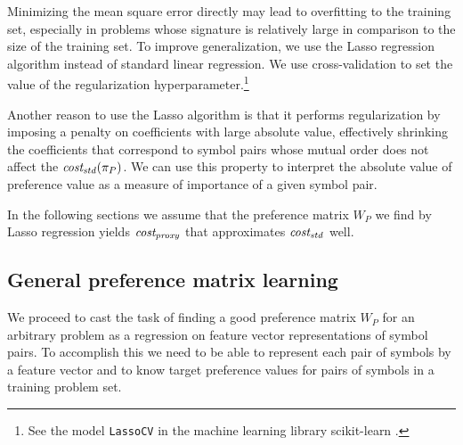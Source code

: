 \documentclass[a4paper]{easychair}
\begin{document}
Minimizing the mean square error directly may lead to overfitting to the training set,
especially in problems whose signature is relatively large in comparison to the size of the training set.
To improve generalization,
we use the Lasso regression algorithm \cite{Tibshirani1996} instead of standard linear regression.
We use cross-validation to set the value of the regularization hyperparameter.\footnote{See the model \texttt{LassoCV} in the machine learning library scikit-learn \cite{scikit-learn}.}

Another reason to use the Lasso algorithm is that it performs regularization
by imposing a penalty on coefficients with large absolute value,
effectively shrinking the coefficients that correspond to symbol pairs
whose mutual order does not affect the \(\operatorname{\mathit{cost_{std}}}(\pi_P)\).
We can use this property to interpret the absolute value of preference value
as a measure of importance of a given symbol pair.

In the following sections we assume that the preference matrix \(W_P\) we find by Lasso regression
yields \(\operatorname{\mathit{cost_{proxy}}}\) that approximates \(\operatorname{\mathit{cost_{std}}}\) well.


\subsection{General preference matrix learning}
\label{sec:general-preference}

We proceed to cast the task of finding a good preference matrix \(W_P\)
for an arbitrary problem as a regression on feature vector representations of symbol pairs.
To accomplish this we need to be able to represent each pair of symbols by a feature vector
and to know target preference values for pairs of symbols in a training problem set.
\end{document}
